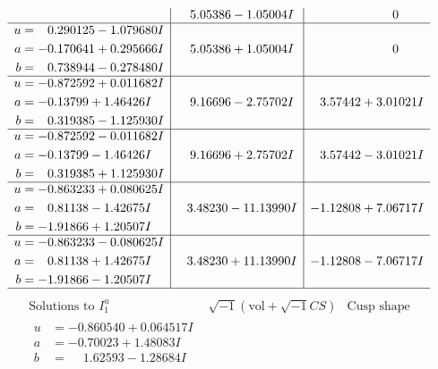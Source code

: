 \documentclass[1p]{elsarticle_modified}
\theoremstyle{definition}
\newcommand{\I}{\sqrt{-1}}
\begin{document}
$$\begin{array}{c|c|c}
 & \phantom{-}5.05386 - 1.05004 I & \phantom{-0.000000 } 0 \\ \hline\begin{aligned}
u &= \phantom{-}0.290125 - 1.079680 I \\
a &= -0.170641 + 0.295666 I \\
b &= \phantom{-}0.738944 - 0.278480 I\end{aligned}
 & \phantom{-}5.05386 + 1.05004 I & \phantom{-0.000000 } 0 \\ \hline\begin{aligned}
u &= -0.872592 + 0.011682 I \\
a &= -0.13799 + 1.46426 I \\
b &= \phantom{-}0.319385 - 1.125930 I\end{aligned}
 & \phantom{-}9.16696 - 2.75702 I & \phantom{-}3.57442 + 3.01021 I \\ \hline\begin{aligned}
u &= -0.872592 - 0.011682 I \\
a &= -0.13799 - 1.46426 I \\
b &= \phantom{-}0.319385 + 1.125930 I\end{aligned}
 & \phantom{-}9.16696 + 2.75702 I & \phantom{-}3.57442 - 3.01021 I \\ \hline\begin{aligned}
u &= -0.863233 + 0.080625 I \\
a &= \phantom{-}0.81138 - 1.42675 I \\
b &= -1.91866 + 1.20507 I\end{aligned}
 & \phantom{-}3.48230 - 11.13990 I & -1.12808 + 7.06717 I \\ \hline\begin{aligned}
u &= -0.863233 - 0.080625 I \\
a &= \phantom{-}0.81138 + 1.42675 I \\
b &= -1.91866 - 1.20507 I\end{aligned}
 & \phantom{-}3.48230 + 11.13990 I & -1.12808 - 7.06717 I\\
 \hline 
 \end{array}$$\newpage$$\begin{array}{c|c|c}  
\text{Solutions to }I^u_{1}& \I (\text{vol} + \sqrt{-1}CS) & \text{Cusp shape}\\
 \hline 
\begin{aligned}
u &= -0.860540 + 0.064517 I \\
a &= -0.70023 + 1.48083 I \\
b &= \phantom{-}1.62593 - 1.28684 I\end{aligned}

\end{array}$$
\end{document}
